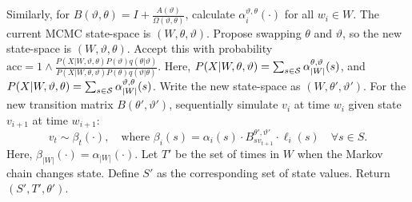 \begin{algorithm}[H]
\begin{algorithmic}[1]
    Similarly, for $B(\vartheta,\theta) = I + \frac{A(\vartheta)}{\Omega(\vartheta, \theta)}$, calculate $\alpha^{\vartheta,\theta}_i(\cdot)$ for all $w_i \in W$.
    \State The current MCMC state-space is $(W,\theta,\vartheta)$. 
    Propose swapping $\theta$ and $\vartheta$, so the new state-space is $(W,\vartheta,\theta)$. 
     Accept this with probability 
     $
     \text{acc} 
        =  1 \wedge \frac{P(X| W,\vartheta,\theta)P(\vartheta)q(\theta|\vartheta)}
        {P(X| W,\theta, \vartheta)P(\theta) q(\vartheta|\theta)}.
        $
        Here, $P(X|W,\theta,\vartheta) = \sum_{s \in {\mathcal S}} \alpha^{\theta,\vartheta}_{|W|}(s)$, and $P(X|W,\vartheta,\theta) = \sum_{s \in {\mathcal S}} \alpha^{\vartheta,\theta}_{|W|}(s)$.
    \State Write the new state-space as $(W,\theta',\vartheta')$.
    For the new transition matrix $B(\theta',\vartheta')$,     sequentially simulate $v_i$ at time $w_i$ given state $v_{i+1}$  at time $w_{i+1}$:
    $$ v_t \sim \beta_t(\cdot),\quad \text{where } 
    \beta_i(s) = \alpha_i(s)\cdot B^{\theta',\vartheta'}_{sv_{t+1}} \cdot \ell_i(s) \quad \forall s \in S.$$
    Here, $\beta_{|W|}(\cdot) = \alpha_{|W|}(\cdot)$.
    \State Let $T'$ be the set of times in $W$ when the Markov chain changes state. Define $S'$ as the corresponding set of state values. Return $(S', T', \theta')$.
\end{algorithmic}
\end{algorithm}

